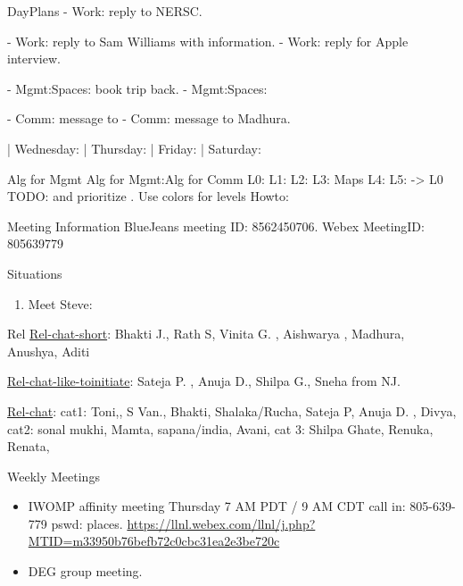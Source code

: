 \begin{columns}
\begin{column}{0.6\linewidth}
\begin{block}{DayPlans}
  - Work: reply to NERSC. 

  - Work: reply to Sam Williams with information. 
  - Work: reply for Apple interview.

  - Mgmt:Spaces: book trip back. 
  - Mgmt:Spaces: 


  - Comm: message to 
  - Comm: message to Madhura.  

  | Wednesday: 
  | Thursday: 
| Friday: 
| Saturday:  
\end{block}

\begin{block}{Alg for Mgmt}
Alg for Mgmt:Alg for Comm   L0:  L1:  L2:  L3:  Maps L4: L5: -> L0
TODO:  and prioritize . Use colors for levels Howto:  
\end{block} 

\begin{block}{Meeting Information}
BlueJeans meeting ID: 8562450706.
Webex MeetingID: 805639779  
\end{block} 

\begin{block}{Situations} 
\begin{enumerate}
\item Meet Steve: 
\end{enumerate} 
\end{block}

\begin{block}{Rel}
\underline{Rel-chat-short}: Bhakti J., Rath S, Vinita G. , Aishwarya ,
Madhura, Anushya, Aditi 

\underline{Rel-chat-like-toinitiate}: Sateja P. , Anuja D., Shilpa G., Sneha from NJ. 

\underline{Rel-chat}:  cat1:  Toni,, S Van., Bhakti, Shalaka/Rucha, Sateja P, Anuja
D. ,  Divya, cat2: sonal mukhi, Mamta, sapana/india, Avani, cat 3:
Shilpa Ghate, Renuka, Renata, 
\end{block}
  
  \begin{block}{Weekly Meetings}
    \begin{itemize}
      \tiny \item \tiny IWOMP affinity meeting Thursday 7 AM PDT / 9 AM
      CDT call in: 805-639-779 pswd: places. \url{https://llnl.webex.com/llnl/j.php?MTID=m33950b76befb72c0cbc31ea2e3be720c}
    \item \tiny DEG group meeting.          \end{itemize}
  \end{block} 


\end{column}
\end{columns}
